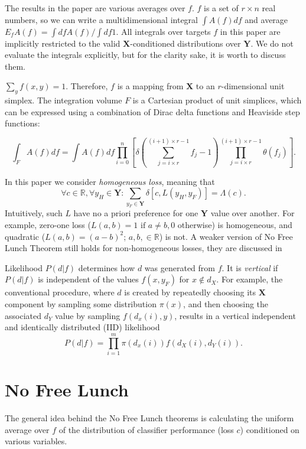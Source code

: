 \documentclass[a4paper]{article}
\begin{document}
The results in the paper are various averages over $f$. $f$ is a set
of $r\times n$ real numbers, so we can write a multidimensional
integral $\int A(f) df$ and average
$E_f A(f) = \int df A(f) / \int df 1$. All integrals over targets $f$
in this paper are implicitly restricted to the valid
$\mathbf{X}$-conditioned distributions over $\mathbf{Y}$. We do not
evaluate the integrals explicitly, but for the clarity sake, it is
worth to discuss them.

$\sum_y f(x,y) = 1$. Therefore, $f$ is a mapping from $\mathbf{X}$ to
an $r$-dimensional unit simplex. The integration volume $F$ is a
Cartesian product of unit simplices, which can be expressed using a
combination of Dirac delta functions and Heaviside step functions:

\begin{equation}
  \int_F A(f) df = \int A(f) df \prod_{i=0}^n\left[\delta\left(\sum_{j=i\times r}^{(i+1)\times r-1}f_j - 1\right) \prod_{j=i\times r}^{(i+1)\times r-1}\theta\left(f_j\right)  \right].
\end{equation}

In this paper we consider \textit{homogeneous loss}, meaning that
\begin{equation}
  \forall c \in \mathbb{R}, \forall y_H \in \mathbf{Y}:
  \sum_{y_F \in \mathbf{Y}} \delta\left[c, L(y_H, y_F)\right] = \Lambda(c).
\end{equation}
Intuitively, such $L$ have no a priori preference for one $\mathbf{Y}$
value over another. For example, zero-one loss
($L(a,b) = 1 \text{ if } a\neq b, 0$ otherwise) is homogeneous, and
quadratic ($L(a,b) = (a - b)^2$; $a, b, \in \mathbb{R}$) is not. A
weaker version of No Free Lunch Theorem still holds for
non-homogeneous losses, they are discussed in \cite{Wolpert-yes-lunch}

Likelihood $P(d|f)$ determines how $d$ was generated from $f$. It is
\textit{vertical} if $P(d|f)$ is independent of the values $f(x, y_F)$
for $x \notin d_X$. For example, the conventional procedure, where $d$
is created by repeatedly choosing its $\mathbf{X}$ component by
sampling some distribution $\pi(x)$, and then choosing the associated
$d_Y$ value by sampling $f\left(d_x(i), y\right)$, results in a
vertical independent and identically distributed (IID) likelihood
\begin{equation}
  P(d|f) = \prod_{i=1}^m \pi(d_x(i)) f(d_X(i), d_Y(i)).
\end{equation}

\section{No Free Lunch}
The general idea behind the No Free Lunch theorems is calculating the
uniform average over $f$ of the distribution of classifier performance
(loss $c$) conditioned on various variables.
\end{document}
